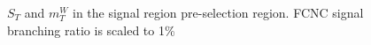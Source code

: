\begin{figure}[h!]
\caption{$S_T$ and $m_T^W$ in the signal region pre-selection region.  FCNC signal branching ratio is scaled to 1\%}
\label{fig:PreSelPlotsST}
\end{figure}

